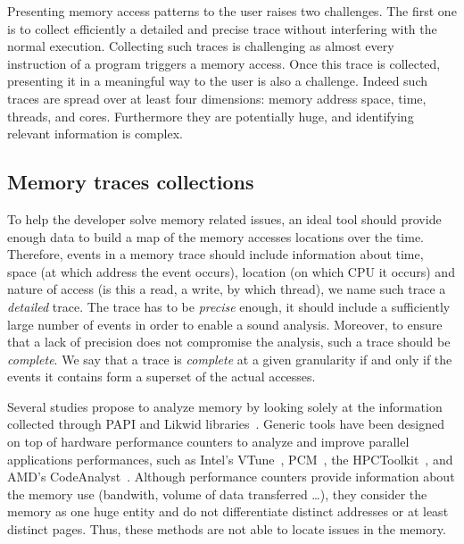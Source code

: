 Presenting memory access patterns to the user raises two challenges.
The first one is to collect efficiently a detailed and precise trace without interfering with the normal execution.
Collecting such traces is challenging as almost every instruction of a program triggers a memory access.
Once this trace is collected, presenting it in a meaningful way to the user is also a challenge.
Indeed such traces are spread over at least four dimensions: memory address space, time, threads, and cores.
Furthermore they are potentially huge, and identifying relevant information is complex.

\subsection{Memory traces collections}

To help the developer solve memory related issues, an ideal tool should provide enough data to build a map of the memory accesses locations over the time.
Therefore, events in a memory trace should include information about time, space (at which address the event occurs), location (on which CPU it occurs) and nature of access (is this a read, a write, by which thread), we name such trace a \emph{detailed} trace.
The trace has to be \emph{precise} enough, it should include a sufficiently large number of events in order to enable a sound analysis.
Moreover, to ensure that a lack of precision does not compromise the analysis, such a trace should be \emph{complete}.
We say that a trace is \emph{complete} at a given granularity if and only if the events it contains form a superset of the actual accesses.

Several studies propose to analyze memory  by looking solely at the information collected through \gls{PAPI} and \gls{Likwid} libraries~\cite{Majo13(Mis)understanding, Jiang14Understanding,Bosch00Rivet,Weyers14Visualization,Tao01Visualizing,DeRose01Hardware}.
Generic tools have been designed on top of hardware performance counters to analyze and improve parallel applications performances, such as Intel's \gls{VTune}~\cite{Reinders05VTune}, \gls{PCM}~\cite{Wilhalm12Intel}, the \gls{HPCToolkit}~\cite{Adhianto10HPCTOOLKIT}, and AMD's \gls{CodeAnalyst}~\cite{Drongowski08introduction}.
Although performance counters provide information about the memory use (bandwith, volume of data transferred \ldots),  they consider the memory as one huge entity and do not differentiate distinct addresses or at least distinct pages.
Thus, these methods are not able to locate issues in the memory.

